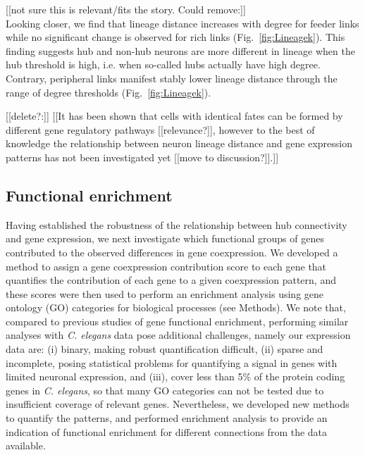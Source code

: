 \documentclass[10pt,letterpaper]{article}
\begin{document}
[[not sure this is relevant/fits the story. Could remove:]]\\
Looking closer, we find that lineage distance increases with degree for feeder links while no significant change is observed for rich links (Fig.~\ref{fig:Lineagek}).
This finding suggests hub and non-hub neurons are more different in lineage when the hub threshold is high, i.e. when so-called hubs actually have high degree. 
Contrary, peripheral links manifest stably lower lineage distance through the range of degree thresholds (Fig.~\ref{fig:Lineagek}).

[[delete?:]]
[[It has been shown that cells with identical fates can be formed by different gene regulatory pathways \cite{Liu2009} [[relevance?]], however to the best of knowledge the relationship between neuron lineage distance and gene expression patterns has not been investigated yet [[move to discussion?]].]]

\subsection*{Functional enrichment}


Having established the robustness of the relationship between hub connectivity and gene expression, we next investigate which functional groups of genes contributed to the observed differences in gene coexpression.
We developed a method to assign a gene coexpression contribution score to each gene that quantifies the contribution of each gene to a given coexpression pattern, and these scores were then used to perform an enrichment analysis using gene ontology (GO) categories for biological processes \cite{Ashburner2000, Gillis2010} (see Methods).
We note that, compared to previous studies of gene functional enrichment, performing similar analyses with \emph{C. elegans} data pose additional challenges, namely our expression data are:
(i) binary, making robust quantification difficult,
(ii) sparse and incomplete, posing statistical problems for quantifying a signal in genes with limited neuronal expression,
and (iii), cover less than 5\% of the protein coding genes in \emph{C. elegans}, so that many GO categories can not be tested due to insufficient coverage of relevant genes.
Nevertheless, we developed new methods to quantify the patterns, and performed enrichment analysis to provide an indication of functional enrichment for different connections from the data available.
\end{document}

